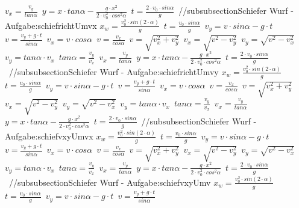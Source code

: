 $ v_{x} = \frac{v_{y} }{tan \alpha } $\ 
$ y = x\cdot tan \alpha  - \frac{   g\cdot x^{2} }{2\cdot v^{2} _{0} \cdot cos ^{2}\alpha } $\ 
$ t =\frac{2\cdot v_{0} \cdot sin \alpha }{ g} $\ 
//subsubsection{Schiefer Wurf  - Aufgabe:schiefrichtUmvx} 
$ x_{w}  = \frac{v_{0} ^{2} \cdot sin(2\cdot \alpha )}{       g} $\ 
$ t =\frac{v_{0} \cdot sin \alpha }{  g} $\ 
$ v_{y}  =  v\cdot sin\alpha - g\cdot t $\ 
$ v= \frac{ v_{y} +g\cdot t}{ sin\alpha } $\ 
$ v_{x}  = v\cdot  cos\alpha $\ 
$ v= \frac{ v_{x} }{ cos\alpha } $\ 
$ v= \sqrt{ v_{x} ^{2} + v_{y} ^{2} } $\ 
$ v_{x} = \sqrt{ v^{2}  - v_{y} ^{2} } $\ 
$ v_{y} = \sqrt{ v^{2}  - v_{x} ^{2} } $\ 
$ v_{y} = tan \alpha \cdot  v_{x} $\ 
$ tan \alpha = \frac{v_{y} }{v_{x} } $\ 
$ v_{x} = \frac{v_{y} }{tan \alpha } $\ 
$ y = x\cdot tan \alpha  - \frac{   g\cdot x^{2} }{2\cdot v^{2} _{0} \cdot cos ^{2}\alpha } $\ 
$ t =\frac{2\cdot v_{0} \cdot sin \alpha }{ g} $\ 
//subsubsection{Schiefer Wurf  - Aufgabe:schiefrichtUmvy} 
$ x_{w}  = \frac{v_{0} ^{2} \cdot sin(2\cdot \alpha )}{       g} $\ 
$ t =\frac{v_{0} \cdot sin \alpha }{  g} $\ 
$ v_{y}  =  v\cdot sin\alpha - g\cdot t $\ 
$ v= \frac{ v_{y} +g\cdot t}{ sin\alpha } $\ 
$ v_{x}  = v\cdot  cos\alpha $\ 
$ v= \frac{ v_{x} }{ cos\alpha } $\ 
$ v= \sqrt{ v_{x} ^{2} + v_{y} ^{2} } $\ 
$ v_{x} = \sqrt{ v^{2}  - v_{y} ^{2} } $\ 
$ v_{y} = \sqrt{ v^{2}  - v_{x} ^{2} } $\ 
$ v_{y} = tan \alpha \cdot  v_{x} $\ 
$ tan \alpha = \frac{v_{y} }{v_{x} } $\ 
$ v_{x} = \frac{v_{y} }{tan \alpha } $\ 
$ y = x\cdot tan \alpha  - \frac{   g\cdot x^{2} }{2\cdot v^{2} _{0} \cdot cos ^{2}\alpha } $\ 
$ t =\frac{2\cdot v_{0} \cdot sin \alpha }{ g} $\ 
//subsubsection{Schiefer Wurf  - Aufgabe:schiefvxyUmvx} 
$ x_{w}  = \frac{v_{0} ^{2} \cdot sin(2\cdot \alpha )}{       g} $\ 
$ t =\frac{v_{0} \cdot sin \alpha }{  g} $\ 
$ v_{y}  =  v\cdot sin\alpha - g\cdot t $\ 
$ v= \frac{ v_{y} +g\cdot t}{ sin\alpha } $\ 
$ v_{x}  = v\cdot  cos\alpha $\ 
$ v= \frac{ v_{x} }{ cos\alpha } $\ 
$ v= \sqrt{ v_{x} ^{2} + v_{y} ^{2} } $\ 
$ v_{x} = \sqrt{ v^{2}  - v_{y} ^{2} } $\ 
$ v_{y} = \sqrt{ v^{2}  - v_{x} ^{2} } $\ 
$ v_{y} = tan \alpha \cdot  v_{x} $\ 
$ tan \alpha = \frac{v_{y} }{v_{x} } $\ 
$ v_{x} = \frac{v_{y} }{tan \alpha } $\ 
$ y = x\cdot tan \alpha  - \frac{   g\cdot x^{2} }{2\cdot v^{2} _{0} \cdot cos ^{2}\alpha } $\ 
$ t =\frac{2\cdot v_{0} \cdot sin \alpha }{ g} $\ 
//subsubsection{Schiefer Wurf  - Aufgabe:schiefvxyUmv} 
$ x_{w}  = \frac{v_{0} ^{2} \cdot sin(2\cdot \alpha )}{       g} $\ 
$ t =\frac{v_{0} \cdot sin \alpha }{  g} $\ 
$ v_{y}  =  v\cdot sin\alpha - g\cdot t $\ 
$ v= \frac{ v_{y} +g\cdot t}{ sin\alpha } $\ 
